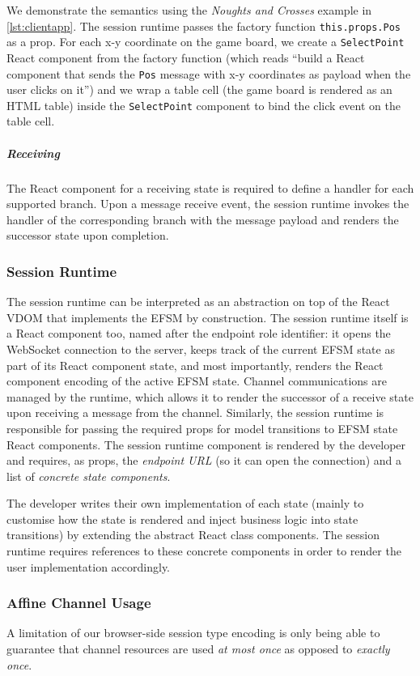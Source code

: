 We demonstrate the semantics using the \textit{Noughts and Crosses} example in
\cref{lst:clientapp}.
The session runtime passes the factory function \texttt{this.props.Pos} as a prop.
For each x-y coordinate on the game board, we
create a \texttt{SelectPoint} React component from the factory function (which
reads ``build a React component that sends the \texttt{Pos} message with x-y
coordinates as payload when the user clicks on it'') and we wrap a table cell
(the game board is rendered as an HTML table) inside the \texttt{SelectPoint}
component to bind the click event on the table cell.

\subparagraph{Receiving}
The React component for a receiving state is required to
define a handler for each supported branch. 
Upon a message receive event, the session runtime invokes the
handler of the corresponding branch with the message payload and 
renders the successor state upon completion.

\subsubsection{Session Runtime}
\label{section:clientruntime}

The session runtime can be interpreted as an abstraction on top of the React
VDOM that implements the EFSM by construction.
The session runtime itself is a React component too, named after the endpoint
role identifier:
it opens the WebSocket connection to the server, keeps track of the current
EFSM state as part of its React component state, and most importantly, renders
the React component encoding of the active EFSM state.
Channel communications are managed by the runtime, which allows it to render
the successor of a receive state upon receiving a message from the channel.
Similarly, the session runtime is responsible for passing the required props
for model transitions to EFSM state React components.
The session runtime component is rendered by the developer and requires, as
props, the \textit{endpoint URL} (so it can open the connection) and a list of
\textit{concrete state components}.

The developer writes their own implementation of each state (mainly to
customise how the state is rendered and inject business logic into state
transitions) by extending the abstract React class components.
The session runtime requires references to these concrete components in order to
render the user implementation accordingly.

\subsubsection{Affine Channel Usage}
A limitation of our browser-side session type encoding is only being able to
guarantee that channel resources are used \textit{at most once} as opposed to
\textit{exactly once}.

